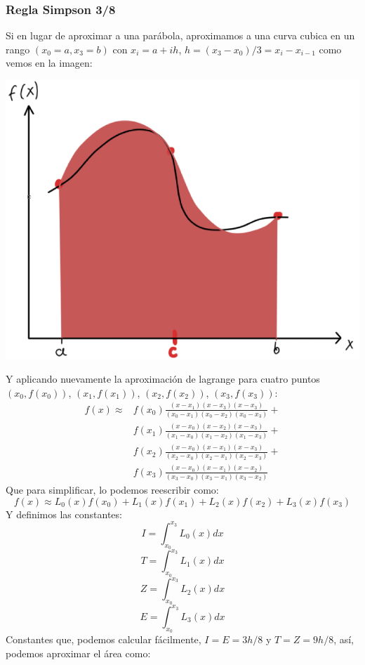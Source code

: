 \documentclass[10pt]{article}
\begin{document}
\begin{multicols}{2}
		\subsubsection{Regla Simpson 3/8}
		Si en lugar de aproximar a una parábola, aproximamos a una curva cubica en un rango $(x_0=a,x_3=b)$ con $x_i=a+ih$, $h=(x_3-x_0)/3=x_{i}-x_{i-1}$ como vemos en la imagen:
		\begin{center}
			\includegraphics[scale=0.2]{../Imagenes/4.png}
		\end{center}
		Y aplicando nuevamente la aproximación de lagrange para cuatro puntos $(x_0,f(x_0))$, $(x_1,f(x_1))$, $(x_2,f(x_2))$, $(x_3,f(x_3))$:
		\begin{equation*}
			\begin{split}
				 f(x)\approx &f(x_0)\frac{(x-x_1)(x-x_3)(x-x_3)}{(x_0-x_1)(x_0-x_2)(x_0-x_3)}+\\ &f(x_1)\frac{(x-x_0)(x-x_2)(x-x_3)}{(x_1-x_0)(x_1-x_2)(x_1-x_3)}+\\
				 &f(x_2)\frac{(x-x_0)(x-x_1)(x-x_3)}{(x_2-x_0)(x_2-x_1)(x_2-x_3)}+\\ &f(x_3)\frac{(x-x_0)(x-x_1)(x-x_2)} {(x_3-x_0)(x_3-x_1)(x_3-x_2)}
			\end{split}
		\end{equation*}
		Que para simplificar, lo podemos reescribir como:
		$$f(x)\approx L_0(x)f(x_0)+L_1(x)f(x_1)+L_2(x)f(x_2)+L_3(x)f(x_3)$$
		Y definimos las constantes:
		$$I=\int_{x_0}^{x_3} L_0(x)dx$$
		$$T=\int_{x_0}^{x_3} L_1(x)dx$$
		$$Z=\int_{x_0}^{x_3} L_2(x)dx$$
		$$E=\int_{x_0}^{x_3} L_3(x)dx$$
		Constantes que, podemos calcular fácilmente, $I=E=3h/8$ y $T=Z=9h/8$, así, podemos aproximar el área como:

\end{multicols}
\end{document}
